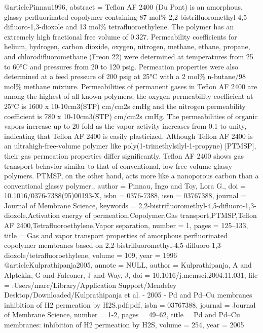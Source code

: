 @article{Pinnau1996,
abstract = {Teflon AF 2400 (Du Pont) is an amorphous, glassy perfluorinated copolymer containing 87 mol{\%} 2,2-bistrifluoromethyl-4,5-difluoro-1,3-dioxole and 13 mol{\%} tetrafluoroethylene. The polymer has an extremely high fractional free volume of 0.327. Permeability coefficients for helium, hydrogen, carbon dioxide, oxygen, nitrogen, methane, ethane, propane, and chlorodifluoromethane (Freon 22) were determined at temperatures from 25 to 60°C and pressures from 20 to 120 psig. Permeation properties were also determined at a feed pressure of 200 psig at 25°C with a 2 mol{\%} n-butane/98 mol{\%} methane mixture. Permeabilities of permanent gases in Teflon AF 2400 are among the highest of all known polymers; the oxygen permeability coefficient at 25°C is 1600 x 10-10cm3(STP) cm/cm2s cmHg and the nitrogen permeability coefficient is 780 x 10-10cm3(STP) cm/cm2s cmHg. The permeabilities of organic vapors increase up to 20-fold as the vapor activity increases from 0.1 to unity, indicating that Teflon AF 2400 is easily plasticized. Although Teflon AF 2400 is an ultrahigh-free-volume polymer like poly(1-trimethylsilyl-1-propyne) [PTMSP], their gas permeation properties differ significantly. Teflon AF 2400 shows gas transport behavior similar to that of conventional, low-free-volume glassy polymers. PTMSP, on the other hand, acts more like a nanoporous carbon than a conventional glassy polymer.},
author = {Pinnau, Ingo and Toy, Lora G.},
doi = {10.1016/0376-7388(95)00193-X},
isbn = {0376-7388},
issn = {03767388},
journal = {Journal of Membrane Science},
keywords = {2,2-bistrifluoromethyl-4,5-difluoro-1,3-dioxole,Activation energy of permeation,Copolymer,Gas transport,PTMSP,Teflon AF 2400,Tetrafluoroethylene,Vapor separation},
number = {1},
pages = {125--133},
title = {{Gas and vapor transport properties of amorphous perfluorinated copolymer membranes based on 2,2-bistrifluoromethyl-4,5-difluoro-1,3-dioxole/tetrafluoroethylene}},
volume = {109},
year = {1996}
}
@article{Kulprathipanja2005,
annote = {NULL},
author = {Kulprathipanja, A and Alptekin, G and Falconer, J and Way, J},
doi = {10.1016/j.memsci.2004.11.031},
file = {:Users/marc/Library/Application Support/Mendeley Desktop/Downloaded/Kulprathipanja et al. - 2005 - Pd and Pd–Cu membranes inhibition of H2 permeation by H2S.pdf:pdf},
isbn = {03767388},
journal = {Journal of Membrane Science},
number = {1-2},
pages = {49--62},
title = {{Pd and Pd–Cu membranes: inhibition of H2 permeation by H2S}},
volume = {254},
year = {2005}
}
